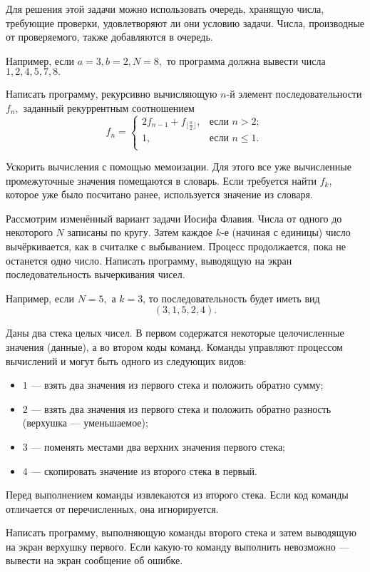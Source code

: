 Для решения этой задачи можно использовать очередь, хранящую числа,
требующие проверки, удовлетворяют ли они условию задачи. Числа,
производные от проверяемого, также добавляются в очередь.

Например, если $a=3, b=2, N=8,$ то программа должна вывести числа
$1, 2, 4, 5, 7, 8.$

\task Написать программу, рекурсивно вычисляющую $n$-й элемент
последовательности $f_n,$ заданный рекуррентным соотношением
\[
f_n = \begin{cases}
2 f_{n-1} + f_{\lfloor\frac{n}2\rfloor},&\text{если }n>2;\\
1,&\text{если }n\leqslant 1.\\
\end{cases}
\]

Ускорить вычисления с помощью мемоизации. Для этого все уже
вычисленные промежуточные значения помещаются в словарь. Если
требуется найти $f_k,$ которое уже было посчитано ранее, используется
значение из словаря.

\task Рассмотрим изменённый вариант задачи Иосифа Флавия. Числа от
одного до некоторого $N$ записаны по кругу. Затем каждое $k$-е
(начиная с единицы) число вычёркивается, как в считалке с
выбыванием. Процесс продолжается, пока не останется одно
число. Написать программу, выводящую на экран последовательность
вычеркивания чисел.

Например, если $N=5,$ а $k=3$, то последовательность будет иметь вид
\[
(3, 1, 5, 2, 4).
\]

\task Даны два стека целых чисел. В первом содержатся некоторые
целочисленные значения (данные), а во втором коды команд. Команды
управляют процессом вычислений и могут быть одного из следующих видов:
\begin{itemize}
\item $1$ — взять два значения из первого стека и положить обратно
  сумму;
\item $2$ — взять два значения из первого стека и положить обратно
  разность (верхушка — уменьшаемое);
\item $3$ — поменять местами два верхних значения первого стека;
\item $4$ — скопировать значение из второго стека в первый.
\end{itemize}
Перед выполнением команды извлекаются из второго стека. Если код
команды отличается от перечисленных, она игнорируется.

Написать программу, выполняющую команды второго стека и затем
выводящую на экран верхушку первого. Если какую-то команду выполнить
невозможно — вывести на экран сообщение об ошибке.

